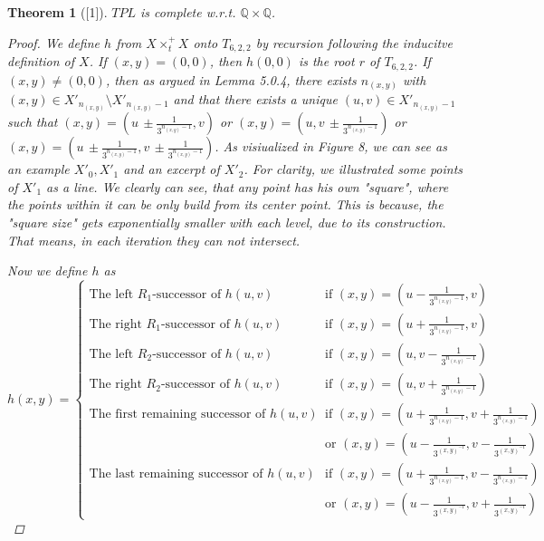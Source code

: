 \documentclass[12pt, a4paper]{scrartcl}
\newtheorem{theorem}[definition]{Theorem}
\begin{document}
\begin{theorem}[\textnormal{[1]}]
    $TPL$ is complete w.r.t. $\mathbb{Q} \times \mathbb{Q}$.

    \begin{proof}
        We define $h$ from $X \times^+_t X$ onto $T_{6,2,2}$ by recursion following the inducitve definition of $X$.
        If $(x,y) = (0,0)$, then $h(0,0)$ is the root $r$ of $T_{6,2,2}$. If $(x,y) \neq (0,0)$, then as argued in Lemma 5.0.4, there exists
        $n_{(x,y)}$ with $(x,y) \in X'_{n_{(x,y)}} \setminus X'_{n_{(x,y)}-1}$ and that there exists a unique $(u,v) \in X'_{n_{(x,y)}-1}$ such that 
        $(x,y) =  (u \, \pm \frac{1}{3^{n_{(x,y)}-1}}, v)$ or $(x,y) =  (u, v \, \pm \frac{1}{3^{n_{(x,y)}-1}})$
        or $(x,y) =  (u \, \pm \frac{1}{3^{n_{(x,y)}-1}}, v \, \pm \frac{1}{3^{n_{(x,y)}-1}})$. \newline 
        As visiualized in Figure 8, we can see as an example $X'_0,X'_1$ and an excerpt of $X'_2$. For clarity, we illustrated some points of $X'_1$ as a line. We clearly can see, 
        that any point has his own "square", where the points within it can be only build from its center point. This is because, the "square size" gets exponentially smaller with each level, due to its construction.
        That means, in each iteration they can not intersect.

        Now we define $h$ as 
        \[
            h(x,y) = 
            \begin{cases}
                \mbox{The left } R_1 \mbox{-successor of } h(u,v)  &\mbox{if } (x,y) = (u- \frac{1}{3^{n_{(x,y)}-1}},v) \\
                \mbox{The right } R_1 \mbox{-successor of } h(u,v)  &\mbox{if } (x,y) = (u+ \frac{1}{3^{n_{(x,y)}-1}},v) \\
                \mbox{The left } R_2 \mbox{-successor of } h(u,v)  &\mbox{if } (x,y) = (u, v - \frac{1}{3^{n_{(x,y)}-1}}) \\
                \mbox{The right } R_2 \mbox{-successor of } h(u,v)  &\mbox{if } (x,y) = (u, v + \frac{1}{3^{n_{(x,y)}-1}}) \\
                \mbox{The first remaining successor of } h(u,v)  &\mbox{if } (x,y) = (u+ \frac{1}{3^{n_{(x,y)}-1}}, v+ \frac{1}{3^{n_{(x,y)}-1}}) \\
                \quad &\text{or } (x, y) = (u - \frac{1}{3^{(x,y)^{-1}}}, v - \frac{1}{3^{(x,y)^{-1}}}) \\
                \mbox{The last remaining successor of } h(u,v)  &\mbox{if } (x,y) = (u+ \frac{1}{3^{n_{(x,y)}-1}}, v- \frac{1}{3^{n_{(x,y)}-1}}) \\
                \quad &\text{or } (x, y) = (u - \frac{1}{3^{(x,y)^{-1}}}, v + \frac{1}{3^{(x,y)^{-1}}}) 
                


\end{cases}\]
\end{proof}
\end{theorem}
\end{document}
